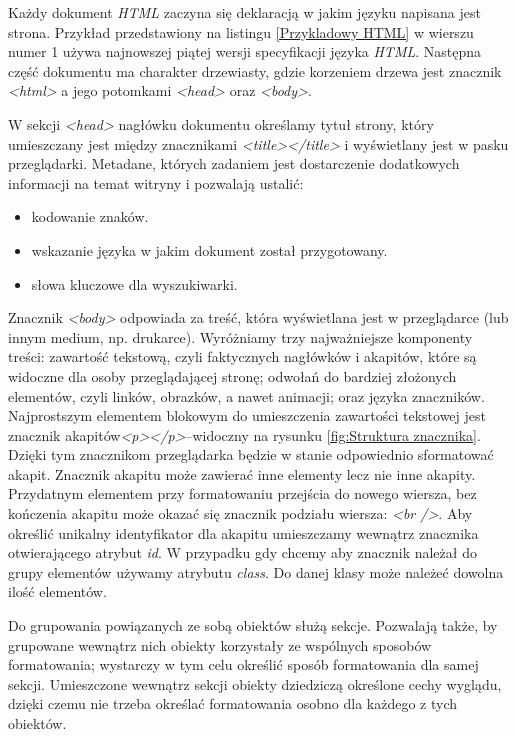 \documentclass{iiuwb}
\begin{document}
Każdy dokument \textit{HTML} zaczyna się deklaracją w jakim języku napisana jest strona. Przykład przedstawiony na listingu \ref{Przykladowy HTML} w wierszu numer 1 używa najnowszej piątej wersji specyfikacji języka \textit{HTML}. Następna część dokumentu ma charakter drzewiasty, gdzie korzeniem drzewa jest znacznik \textit{<html>} a jego potomkami \textit{<head>} oraz \textit{<body>}.

W sekcji \textit{<head>} nagłówku dokumentu określamy tytuł strony, który umieszczany jest między znacznikami \textit{<title></title>} i wyświetlany jest w pasku przeglądarki. Metadane, których zadaniem jest dostarczenie dodatkowych informacji na temat witryny i pozwalają ustalić:

\begin{itemize}
\item kodowanie znaków.
\item wskazanie języka w jakim dokument został przygotowany.
\item słowa kluczowe dla wyszukiwarki.
\end{itemize}

Znacznik \textit{<body>} odpowiada za treść, która wyświetlana jest w przeglądarce (lub innym medium, np. drukarce). Wyróżniamy trzy najważniejsze komponenty treści: zawartość tekstową, czyli faktycznych nagłówków i akapitów, które są widoczne dla osoby przeglądającej stronę; odwołań do bardziej złożonych elementów, czyli linków, obrazków, a nawet animacji; oraz języka znaczników. Najprostszym elementem blokowym do umieszczenia zawartości tekstowej jest znacznik akapitów\textit{<p></p>}--widoczny na rysunku \ref{fig:Struktura znacznika}. Dzięki tym znacznikom przeglądarka będzie w stanie odpowiednio sformatować akapit. Znacznik akapitu może zawierać inne elementy lecz nie inne akapity. Przydatnym elementem przy formatowaniu przejścia do nowego wiersza, bez kończenia akapitu może okazać się znacznik podziału wiersza: \textit{<br />}. Aby określić unikalny identyfikator dla akapitu umieszczamy wewnątrz znacznika otwierającego atrybut \textit{id}. W przypadku gdy chcemy aby znacznik należał do grupy elementów używamy atrybutu \textit{class}. Do danej klasy może należeć dowolna ilość elementów.

Do grupowania powiązanych ze sobą obiektów służą sekcje. Pozwalają także, by grupowane wewnątrz nich obiekty korzystały ze wspólnych sposobów formatowania; wystarczy w tym celu określić sposób formatowania dla samej sekcji. Umieszczone wewnątrz sekcji obiekty dziedziczą określone cechy wyglądu, dzięki czemu nie trzeba określać formatowania osobno dla każdego z tych obiektów. 
\end{document}
